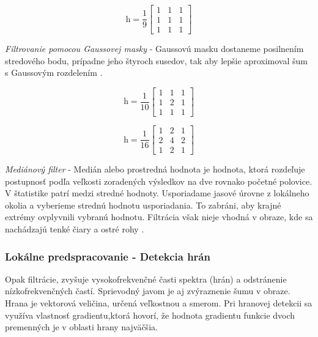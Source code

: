 $$\textit{h}=\frac{1}{9}\begin{bmatrix} 1 & 1 & 1 \\ 1 & 1 & 1 \\ 1 & 1 & 1  \end{bmatrix}$$

\textit{Filtrovanie pomocou Gaussovej masky} - Gaussovú masku dostaneme posilnením stredového bodu, prípadne jeho štyroch susedov, tak aby lepšie aproximoval šum s Gaussovým rozdelením \cite{Detekcia_a_rozpoznavanie_objektov}.


\begin{figure}[H]
    \centering
    \begin{minipage}[b]{0.49\textwidth}
        $$\textit{h}=\frac{1}{10}\begin{bmatrix} 1 & 1 & 1 \\ 1 & 2 & 1 \\ 1 & 1 & 1  \end{bmatrix}$$
    \end{minipage}
    \hfill
    \begin{minipage}[b]{0.49\textwidth}
        $$\textit{h}=\frac{1}{16}\begin{bmatrix} 1 & 2 & 1 \\ 2 & 4 & 2 \\ 1 & 2 & 1  \end{bmatrix}$$
    \end{minipage}
\end{figure}


\textit{Mediánový filter} - Medián alebo prostredná hodnota je hodnota, ktorá rozdeľuje postupnosť podľa veľkosti zoradených výsledkov na dve rovnako početné polovice. V štatistike patrí medzi stredné hodnoty. Usporiadame jasové úrovne z lokálneho okolia a vyberieme strednú hodnotu usporiadania. To zabráni, aby krajné extrémy ovplyvnili vybranú hodnotu. Filtrácia však nieje vhodná v obraze, kde sa nachádzajú tenké čiary a ostré rohy \cite{Detekcia_a_rozpoznavanie_objektov}. 


\subsubsection{Lokálne predspracovanie - Detekcia hrán}
\label{sec:edge}
Opak filtrácie, zvyšuje vysokofrekvenčné časti spektra (hrán) a odstránenie nízkofrekvenčných častí. Sprievodný javom je aj zvýraznenie šumu v obraze.  Hrana je vektorová veličina, určená veľkostnou a smerom. Pri hranovej detekcii sa využíva vlastnosť gradientu,ktorá hovorí, že hodnota gradientu funkcie dvoch premenných je v oblasti hrany najväčšia. 
\vspace{5mm}



